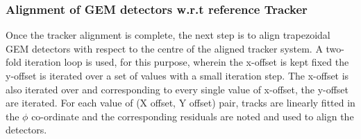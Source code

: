 \subsubsection{Alignment of GEM detectors w.r.t reference Tracker}
Once the tracker alignment is complete, the next step is to align trapezoidal GEM detectors with respect to the centre of the aligned tracker system.
A two-fold iteration loop is used, for this purpose, wherein the x-offset is kept fixed the y-offset is iterated over a set of values with a small iteration step.
The x-offset is also iterated over and corresponding to every single value of x-offset, the y-offset are iterated.
For each value of (X offset, Y offset) pair, tracks are linearly fitted in the $\phi$ co-ordinate and the corresponding residuals are noted and used to align the detectors.

